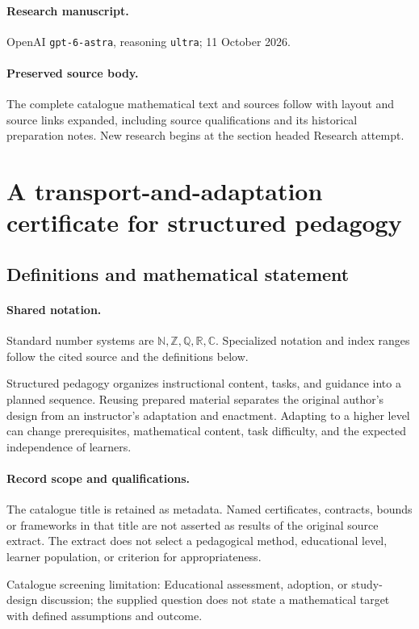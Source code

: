 \documentclass[11pt]{article}
\begin{document}
\paragraph{Research manuscript.} OpenAI \texttt{gpt-6-astra}, reasoning \texttt{ultra}; 11 October 2026.
\paragraph{Preserved source body.} The complete catalogue mathematical text and sources follow with layout and source links expanded, including source qualifications and its historical preparation notes. New research begins at the section headed Research attempt.

\section{A transport-and-adaptation certificate for structured pedagogy}\label{statement}

\subsection{Definitions and mathematical statement}

\paragraph{Shared notation.}Standard number systems are $\mathbb N,\mathbb Z,\mathbb Q,\mathbb R,\mathbb C$. Specialized notation and index ranges follow the cited source and the definitions below.


Structured pedagogy organizes instructional content, tasks, and guidance into a planned sequence. Reusing prepared material separates the original author's design from an instructor's adaptation and enactment. Adapting to a higher level can change prerequisites, mathematical content, task difficulty, and the expected independence of learners.
\paragraph{Record scope and qualifications.}
The catalogue title is retained as metadata. Named certificates, contracts, bounds or frameworks in that title are not asserted as results of the original source extract.
The extract does not select a pedagogical method, educational level, learner population, or criterion for appropriateness.

Catalogue screening limitation: Educational assessment, adoption, or study-design discussion; the supplied question does not state a mathematical target with defined assumptions and outcome.
\end{document}
